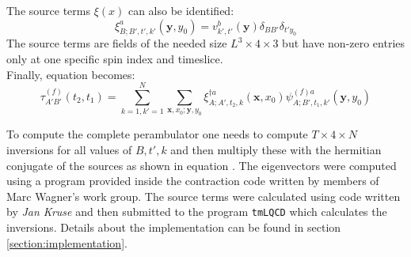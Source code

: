     \noindent
    The source terms $\xi(x)$ can also be identified:
    \begin{equation}
        \xi^a_{B;B',t',k'}(\textbf{y},y_0) =  v_{k',t'}^{b}(\textbf{y})\delta_{BB'}\delta_{t'y_0}
    \end{equation}
    The source terms are fields of the needed size $L^3 \times 4 \times 3$ but have non-zero entries only at one specific spin index and timeslice.\\
    
    \noindent
    Finally, equation  becomes:
    \begin{equation}\label{perambulator_with_inversion}
        \tau^{(f)}_{A'B'}(t_2,t_1) = \sum_{k=1,k'=1}^N \sum_{\textbf{x},x_0;\textbf{y},y_0} \xi^{\dagger a}_{A;A',t_2,k}(\textbf{x},x_0) \psi^{(f)a}_{A;B',t_1,k'}(\textbf{y},y_0) 
    \end{equation}
    
    \noindent
    To compute the complete perambulator one needs to compute $T \times 4 \times N$ inversions for all values of $B,t',k$ and then multiply these with the hermitian conjugate of the sources as shown in equation . The eigenvectors were computed using a program provided inside the contraction code written by members of Marc Wagner's work group. The source terms were calculated using code written by \textit{Jan Kruse} \cite{bachelor_thesis_jan} and then submitted to the program \verb+tmLQCD+ \cite{jansen_urbach_2009} which calculates the inversions. Details about the implementation can be found in section \ref{section:implementation}.
    